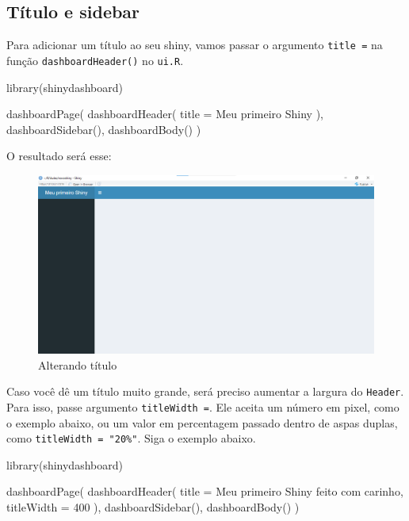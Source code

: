 \documentclass[
]{book}
\newenvironment{Shaded}{\begin{snugshade}}{\end{snugshade}}
\newcommand{\AttributeTok}[1]{\textcolor[rgb]{0.77,0.63,0.00}{#1}}
\newcommand{\DecValTok}[1]{\textcolor[rgb]{0.00,0.00,0.81}{#1}}
\newcommand{\FunctionTok}[1]{\textcolor[rgb]{0.00,0.00,0.00}{#1}}
\newcommand{\NormalTok}[1]{#1}
\newcommand{\StringTok}[1]{\textcolor[rgb]{0.31,0.60,0.02}{#1}}
\begin{document}
\hypertarget{tuxedtulo-e-sidebar}{%
\subsection{Título e sidebar}\label{tuxedtulo-e-sidebar}}

Para adicionar um título ao seu shiny, vamos passar o argumento \texttt{title\ =} na função \texttt{dashboardHeader()} no \texttt{ui.R}.

\begin{Shaded}
\begin{Highlighting}[]
\FunctionTok{library}\NormalTok{(shinydashboard)}

\FunctionTok{dashboardPage}\NormalTok{(}
  \FunctionTok{dashboardHeader}\NormalTok{(}
    \AttributeTok{title =} \StringTok{\textquotesingle{}Meu primeiro Shiny\textquotesingle{}}
\NormalTok{  ),}
  \FunctionTok{dashboardSidebar}\NormalTok{(),}
  \FunctionTok{dashboardBody}\NormalTok{()}
\NormalTok{)}
\end{Highlighting}
\end{Shaded}

O resultado será esse:

\begin{figure}
\centering
\includegraphics{./imagens/cap10imagem7.png}
\caption{Alterando título}
\end{figure}

Caso você dê um título muito grande, será preciso aumentar a largura do \texttt{Header}. Para isso, passe argumento \texttt{titleWidth\ =}. Ele aceita um número em pixel, como o exemplo abaixo, ou um valor em percentagem passado dentro de aspas duplas, como \texttt{titleWidth\ =\ "20\%"}. Siga o exemplo abaixo.

\begin{Shaded}
\begin{Highlighting}[]
\FunctionTok{library}\NormalTok{(shinydashboard)}

\FunctionTok{dashboardPage}\NormalTok{(}
  \FunctionTok{dashboardHeader}\NormalTok{(}
    \AttributeTok{title =} \StringTok{\textquotesingle{}Meu primeiro Shiny feito com carinho\textquotesingle{}}\NormalTok{,}
    \AttributeTok{titleWidth =} \DecValTok{400}
\NormalTok{  ),}
  \FunctionTok{dashboardSidebar}\NormalTok{(),}
  \FunctionTok{dashboardBody}\NormalTok{()}
\NormalTok{)}
\end{Highlighting}
\end{Shaded}
\end{document}
